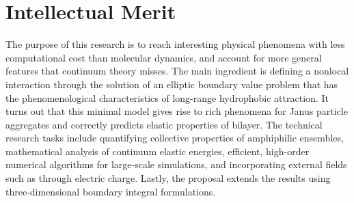 %
%

\section{Intellectual Merit}
The purpose of this research is to reach interesting physical phenomena with 
less computational cost than molecular dynamics, and account for more general
features that continuum theory misses. The main ingredient is defining a 
nonlocal interaction through the solution of an elliptic boundary value problem
that has the phenomenological characteristics of long-range hydrophobic
attraction. It turns out that this minimal model gives rise to rich phenomena
for Janus particle aggregates and correctly predicts elastic properties of bilayer. 
The technical research tasks include quantifying collective properties of 
amphiphilic ensembles, mathematical analysis of continuum elastic energies, 
efficient, high-order numerical algorithms for large-scale simulations, and 
incorporating external fields such as through electric charge. Lastly, the proposal 
extends the results using three-dimensional boundary integral formulations.


